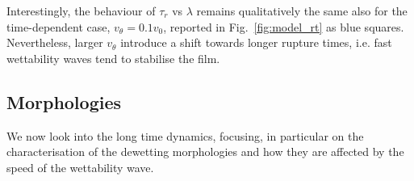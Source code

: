 \documentclass[twocolumn,amsmath,amssymb,showpacs,pre,nofootinbib,superscriptaddress]{revtex4-1} %
\begin{document}
Interestingly, the behaviour of $\tau_r$ vs $\lambda$ remains qualitatively the same also for the
time-dependent case, $v_{\theta} = 0.1v_0$, reported in Fig.~\ref{fig:model_rt} as blue squares.
Nevertheless, larger $v_{\theta}$ introduce a shift towards longer rupture times, i.e. fast wettability
waves tend to stabilise the film.

\subsection{Morphologies}\label{subsec:morpho}
We now look into the long time dynamics, focusing, in particular on the characterisation of the
dewetting morphologies and how they are affected by the speed of the wettability wave.
\end{document}
